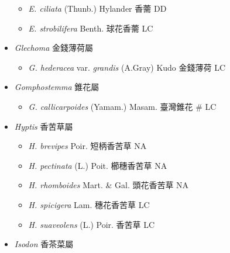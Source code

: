 \begin{itemize}
  \begin{itemize}
        \item[] \textit{E. ciliata} (Thunb.) Hylander  香薷   DD
        \item[] \textit{E. strobilifera} Benth.  球花香薷   LC
  \end{itemize}
 \item[] \textit{Glechoma} 金錢薄荷屬
                                
  \begin{itemize}
        \item[] \textit{G. hederacea} var. \textit{grandis} (A.Gray) Kudo  金錢薄荷   LC
  \end{itemize}
 \item[] \textit{Gomphostemma} 錐花屬
                                
  \begin{itemize}
        \item[] \textit{G. callicarpoides} (Yamam.) Masam.  臺灣錐花  \# LC
  \end{itemize}
 \item[] \textit{Hyptis} 香苦草屬
                                
  \begin{itemize}
        \item[] \textit{H. brevipes} Poir.  短柄香苦草   NA
        \item[] \textit{H. pectinata} (L.) Poit.  櫛穗香苦草   NA
        \item[] \textit{H. rhomboides} Mart. \& Gal.  頭花香苦草   NA
        \item[] \textit{H. spicigera} Lam.  穗花香苦草   LC
        \item[] \textit{H. suaveolens} (L.) Poir.  香苦草   LC
  \end{itemize}
 \item[] \textit{Isodon} 香茶菜屬
                                

\end{itemize}
